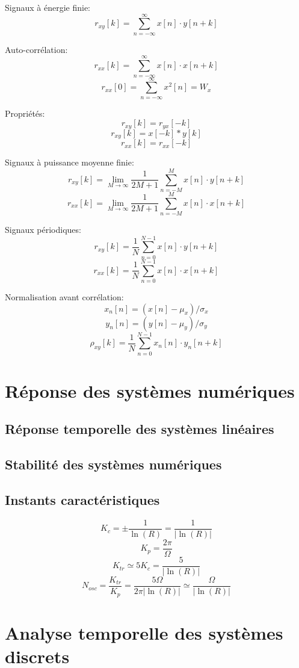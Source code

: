 \documentclass[10pt, twocolumn]{article}
\begin{document}
			Signaux à énergie finie:
			\[r_{x y}[k]=\sum_{n=-\infty}^{\infty} x[n] \cdot y[n+k]\]
			
			Auto-corrélation:
			\[r_{x x}[k]=\sum_{n=-\infty}^{\infty} x[n] \cdot x[n+k]\]
			\[r_{x x}[0]=\sum_{n=-\infty}^{\infty} x^{2}[n]=W_{x}\]
			
			Propriétés:
			\[r_{x y}[k]=r_{y x}[-k]\]
			\[r_{x y}[k]=x[-k] * y[k]\]
			\[r_{x x}[k]=r_{x x}[-k]\]
			
			Signaux à puissance moyenne finie:
			\[r_{x y}[k]=\lim _{M \rightarrow \infty} \frac{1}{2 M+1} \sum_{n=-M}^{M} x[n] \cdot y[n+k]\]
			\[r_{x x}[k]=\lim _{M \rightarrow \infty} \frac{1}{2 M+1} \sum_{n=-M}^{M} x[n] \cdot x[n+k]\]
			
			Signaux périodiques:
			\[r_{x y}[k]=\frac{1}{N} \sum_{n=0}^{N-1} x[n] \cdot y[n+k]\]
			\[r_{x x}[k]=\frac{1}{N} \sum_{n=0}^{N-1} x[n] \cdot x[n+k]\]
			
			Normalisation avant corrélation:
			\[x_{n}[n]=\left(x[n]-\mu_{x}\right) / \sigma_{x}\]
			\[y_{n}[n]=\left(y[n]-\mu_{y}\right) / \sigma_{y}\]
			\[\rho_{x y}[k]=\frac{1}{N} \sum_{n=0}^{N-1} x_{n}[n] \cdot y_{n}[n+k]\]
			
	\section*{Réponse des systèmes numériques}
		
		\subsection*{Réponse temporelle des systèmes linéaires}
		\subsection*{Stabilité des systèmes numériques}
		\subsection*{Instants caractéristiques}
			
			\[K_{c}=\pm \frac{1}{\ln (R)}=\frac{1}{|\ln (R)|}\]
			\[K_{p}=\frac{2 \pi}{\Omega}\]
			\[K_{t r} \simeq 5 K_{c}=\frac{5}{|\ln (R)|}\]
			\[N_{osc}=\frac{K_{t r}}{K_{p}}=\frac{5 \Omega}{2 \pi|\ln (R)|} \simeq \frac{\Omega}{|\ln (R)|}\]
	
	\section*{Analyse temporelle des systèmes discrets}
		
\end{document}
